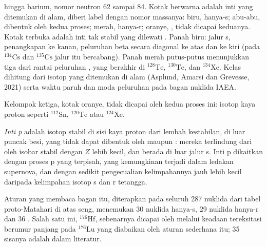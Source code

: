 \begin{omfigure}
{hingga barium, nomor neutron 62 sampai 84. Kotak berwarna adalah inti yang ditemukan di alam, diberi label
dengan nomor massanya: biru, hanya-s; abu-abu, dibentuk oleh kedua proses; merah,
hanya-r; oranye, , tidak dicapai keduanya. Kotak terbuka adalah
inti tak stabil yang dilewati . Panah biru: jalur s,
penangkapan ke kanan, peluruhan beta secara diagonal ke atas dan ke kiri (pada
$^{134}\mathrm{Cs}$ dan $^{135}\mathrm{Cs}$ jalur itu bercabang). Panah merah putus-putus
menunjukkan tiga dari rantai peluruhan , yang berakhir di
$^{128}\mathrm{Te}$, $^{130}\mathrm{Te}$, dan $^{134}\mathrm{Xe}$. Kelas
dihitung dari isotop yang ditemukan di alam (Asplund,
Amarsi dan Grevesse, 2021) serta waktu paruh dan moda peluruhan pada
bagan nuklida IAEA.}\label{fig:b3:origin-of-elements:chart}
\end{omfigure}

Kelompok ketiga, kotak oranye, tidak dicapai oleh kedua proses ini:
isotop kaya proton seperti $^{112}\mathrm{Sn}$, $^{120}\mathrm{Te}$
atau $^{124}\mathrm{Xe}$.

\begin{definition}[inti p]\label{def:b3:origin-of-elements:p-process}
\emph{Inti p} adalah isotop stabil di sisi kaya proton
dari lembah kestabilan, di luar puncak besi, yang
tidak dapat dibentuk oleh  maupun : mereka terlindung
dari  oleh isobar stabil dengan $Z$ lebih kecil, dan berada di luar
jalur s. Inti p dikaitkan dengan proses p yang terpisah, yang kemungkinan terjadi dalam
ledakan supernova, dan dengan sedikit pengecualian kelimpahannya jauh lebih kecil daripada
kelimpahan isotop s dan r tetangga.
\end{definition}

Aturan yang membaca bagan itu, diterapkan pada seluruh 287 nuklida dari
tabel proto-Matahari di atas seng, menemukan 30 nuklida hanya-s, 29 nuklida hanya-r
dan 36 . Salah satu  ini, $^{176}\mathrm{Hf}$, sebenarnya dicapai oleh
 melalui keadaan tereksitasi berumur panjang pada
$^{176}\mathrm{Lu}$ yang diabaikan oleh aturan sederhana itu; 35 sisanya adalah 
dalam literatur.

